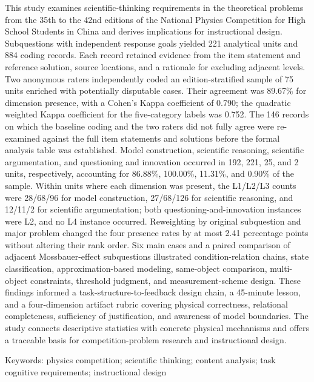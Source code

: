 \documentclass[
  12pt,
  a4paper,twoside,openany]{ctexbook}
\begin{document}
This study examines scientific-thinking requirements in the theoretical
problems from the 35th to the 42nd editions of the National Physics
Competition for High School Students in China and derives implications
for instructional design. Subquestions with independent response goals
yielded 221 analytical units and 884 coding records. Each record
retained evidence from the item statement and reference solution, source
locations, and a rationale for excluding adjacent levels. Two anonymous
raters independently coded an edition-stratified sample of 75 units
enriched with potentially disputable cases. Their agreement was 89.67\%
for dimension presence, with a Cohen's Kappa coefficient of 0.790; the
quadratic weighted Kappa coefficient for the five-category labels was
0.752. The 146 records on which the baseline coding and the two raters
did not fully agree were re-examined against the full item statements
and solutions before the formal analysis table was established. Model
construction, scientific reasoning, scientific argumentation, and
questioning and innovation occurred in 192, 221, 25, and 2 units,
respectively, accounting for 86.88\%, 100.00\%, 11.31\%, and 0.90\% of
the sample. Within units where each dimension was present, the L1/L2/L3
counts were 28/68/96 for model construction, 27/68/126 for scientific
reasoning, and 12/11/2 for scientific argumentation; both
questioning-and-innovation instances were L2, and no L4 instance
occurred. Reweighting by original subquestion and major problem changed
the four presence rates by at most 2.41 percentage points without
altering their rank order. Six main cases and a paired comparison of
adjacent Mossbauer-effect subquestions illustrated condition-relation
chains, state classification, approximation-based modeling, same-object
comparison, multi-object constraints, threshold judgment, and
measurement-scheme design. These findings informed a
task-structure-to-feedback design chain, a 45-minute lesson, and a
four-dimension artifact rubric covering physical correctness, relational
completeness, sufficiency of justification, and awareness of model
boundaries. The study connects descriptive statistics with concrete
physical mechanisms and offers a traceable basis for competition-problem
research and instructional design.

Keywords: physics competition; scientific thinking; content analysis;
task cognitive requirements; instructional design


\endgroup
\clearpage
\setcounter{tocdepth}{2}
\tableofcontents
\clearpage
{}
{}
\listoffigures
\clearpage
{}
{}
\listoftables
\mainmatter
{}
\end{document}

